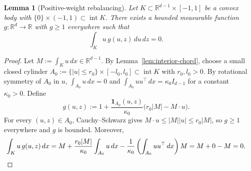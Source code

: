 \documentclass[11pt,a4paper]{amsart}
\numberwithin{equation}{section}
\newtheorem{lemma}[theorem]{Lemma}
\theoremstyle{definition}
\newcommand{\R}{\mathbb{R}}
\newcommand{\inte}{\operatorname{int}}
\newcommand{\one}{\mathbf{1}}
\begin{document}
\begin{lemma}[Positive-weight rebalancing]
\label{lem:rebalance}
Let $K \subset \R^{d-1} \times [-1, 1]$ be a convex body with $\{0\} \times (-1, 1) \subset \inte K$. There exists a bounded measurable function $g : \R^d \to \R$ with $g \ge 1$ everywhere such that
\[
\int_K u\, g(u,z)\, du\, dz = 0.
\]
\end{lemma}

\begin{proof}
Let $M := \int_K u\, dx \in \R^{d-1}$. By Lemma~\ref{lem:interior-chord}, choose a small closed cylinder $A_0 := \{|u| \le r_0\} \times [-l_0, l_0] \subset \inte K$ with $r_0, l_0 > 0$. By rotational symmetry of $A_0$ in $u$, $\int_{A_0} u\, dx = 0$ and $\int_{A_0} u u^\top \, dx = \kappa_0 I_{d-1}$ for a constant $\kappa_0 > 0$. Define
\[
g(u, z) := 1 + \frac{\one_{A_0}(u,z)}{\kappa_0}\bigl(r_0 |M| - M \cdot u\bigr).
\]
For every $(u,z) \in A_0$, Cauchy--Schwarz gives $M \cdot u \le |M| |u| \le r_0 |M|$, so $g \ge 1$ everywhere and $g$ is bounded. Moreover,
\[
\int_K u\, g(u,z)\, dx = M + \frac{r_0 |M|}{\kappa_0} \int_{A_0} u\, dx - \frac{1}{\kappa_0} \left(\int_{A_0} u u^\top \, dx\right) M = M + 0 - M = 0. \qedhere
\]
\end{proof}
\end{document}

